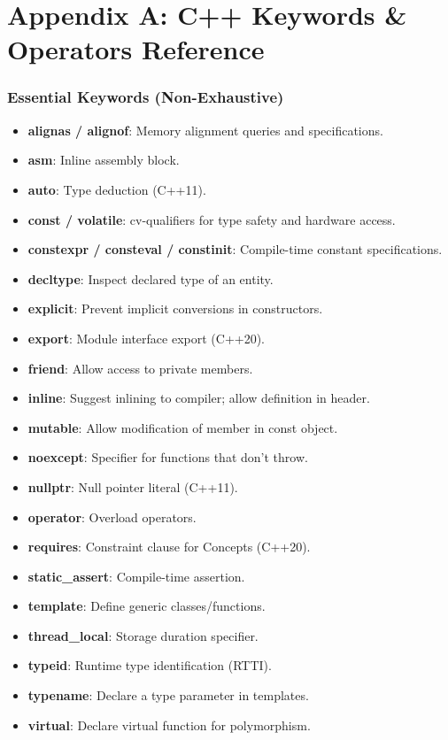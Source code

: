\hypertarget{appendix-a-c-keywords-operators-reference}{%
\chapter{Appendix A: C++ Keywords \& Operators
Reference}\label{appendix-a-c-keywords-operators-reference}}

\hypertarget{essential-keywords-non-exhaustive}{%
\subsection{Essential Keywords
(Non-Exhaustive)}\label{essential-keywords-non-exhaustive}}

\begin{itemize}
\tightlist
\item
  \textbf{alignas / alignof}: Memory alignment queries and
  specifications.
\item
  \textbf{asm}: Inline assembly block.
\item
  \textbf{auto}: Type deduction (C++11).
\item
  \textbf{const / volatile}: cv-qualifiers for type safety and hardware
  access.
\item
  \textbf{constexpr / consteval / constinit}: Compile-time constant
  specifications.
\item
  \textbf{decltype}: Inspect declared type of an entity.
\item
  \textbf{explicit}: Prevent implicit conversions in constructors.
\item
  \textbf{export}: Module interface export (C++20).
\item
  \textbf{friend}: Allow access to private members.
\item
  \textbf{inline}: Suggest inlining to compiler; allow definition in
  header.
\item
  \textbf{mutable}: Allow modification of member in const object.
\item
  \textbf{noexcept}: Specifier for functions that don't throw.
\item
  \textbf{nullptr}: Null pointer literal (C++11).
\item
  \textbf{operator}: Overload operators.
\item
  \textbf{requires}: Constraint clause for Concepts (C++20).
\item
  \textbf{static\_assert}: Compile-time assertion.
\item
  \textbf{template}: Define generic classes/functions.
\item
  \textbf{thread\_local}: Storage duration specifier.
\item
  \textbf{typeid}: Runtime type identification (RTTI).
\item
  \textbf{typename}: Declare a type parameter in templates.
\item
  \textbf{virtual}: Declare virtual function for polymorphism.
\end{itemize}

